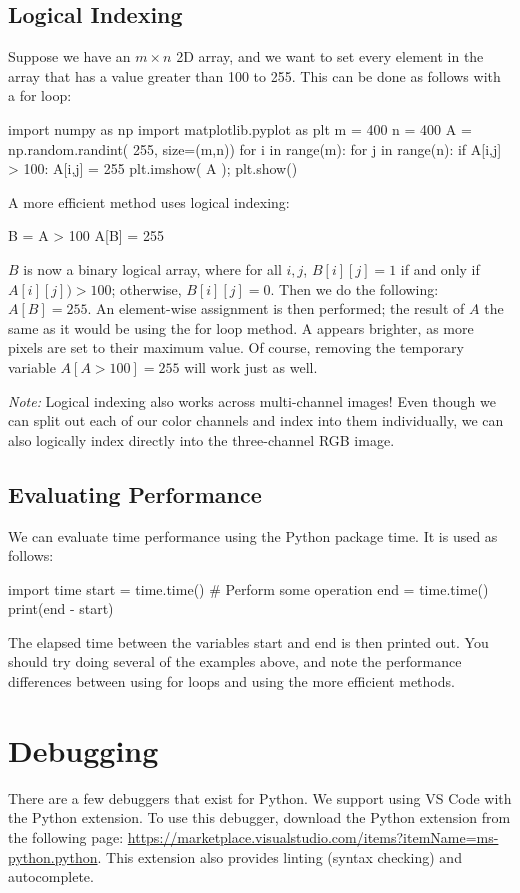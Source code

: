 \documentclass{article}
\begin{document}
\subsection{Logical Indexing}
Suppose we have an $m \times n$ 2D array, and we want to set every element in the array that has a value greater than 100 to 255. This can be done as follows with a for loop:
\begin{python}
import numpy as np
import matplotlib.pyplot as plt
m = 400
n = 400
A = np.random.randint( 255, size=(m,n))
for i in range(m):
    for j in range(n):
        if A[i,j] > 100:
            A[i,j] = 255
plt.imshow( A );
plt.show()
\end{python}

A more efficient method uses logical indexing:
\begin{python}
B = A > 100
A[B] = 255
\end{python}

$B$ is now a binary logical array, where for all $i,j$, $B[i][j]=1$ if and only if $A[i][j]) > 100$; otherwise, $B[i][j]=0$. Then we do the following: $A[B] = 255$. An element-wise assignment is then performed; the result of $A$ the same as it would be using the for loop method. A appears brighter, as more pixels are set to their maximum value. Of course, removing the temporary variable $A[A > 100] = 255$ will work just as well.

\emph{Note:} Logical indexing also works across multi-channel images! Even though we can split out each of our color channels and index into them individually, we can also logically index directly into the three-channel RGB image.

\subsection{Evaluating Performance}
We can evaluate time performance using the Python package time. It is used as follows:
\begin{python}
import time
start = time.time()
# Perform some operation
end = time.time()
print(end - start)
\end{python}

The elapsed time between the variables start and end is then printed out. You should try doing several of the examples above, and note the performance differences between using for loops and using the more efficient methods.


\section{Debugging}
\label{sec:debugger}
There are a few debuggers that exist for Python. We support using VS Code with the Python extension. 
To use this debugger, download the Python extension from the following page: \href{https://marketplace.visualstudio.com/items?itemName=ms-python.python}{https://marketplace.visualstudio.com/items?itemName=ms-python.python}. This extension also provides linting (syntax checking) and autocomplete. 
\end{document}
